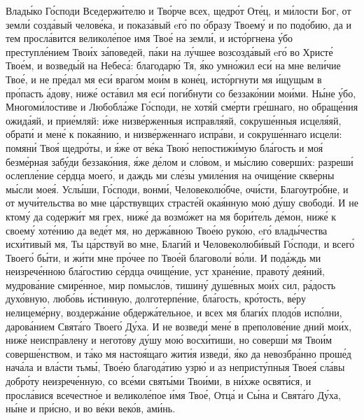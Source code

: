 \begin{mymulticols}
Влад\'{ы}ко Г\'{о}споди Вседерж\'{и}телю и Тв\'{о}рче всех, щедр\'{о}т От\'{е}ц, и м\'{и}лости Бог, от земл\'{и} созд\'{а}вый челов\'{е}ка, и показ\'{а}вый eг\'{о} по \'{о}бразу Твоем\'{у} и по под\'{о}бию, да и тем просл\'{а}вится великол\'{е}пое имя Тво\'{е} на земл\'{и}, и ист\'{о}ргнена \'{у}бо преступл\'{е}нием Тво\'{и}х з\'{а}поведей, п\'{а}ки на л\'{у}чшее возсозд\'{а}вый eг\'{о} во Христ\'{е} Тво\'{е}м, и возвед\'{ы}й на Небес\'{а}: благодар\'{ю} Тя, \'{я}ко умн\'{о}жил ес\'{и} на мне вел\'{и}чие Тво\'{е}, и не пр\'{е}дал мя ес\'{и} враг\'{о}м мо\'{и}м в кон\'{е}ц, ист\'{о}ргнути мя \'{и}щущым в пр\'{о}пасть \'{а}дову, ниж\'{е} ост\'{а}вил мя ес\'{и} пог\'{и}бнути со беззак\'{о}нии мо\'{и}ми. Н\'{ы}не \'{у}бо, Многом\'{и}лостиве и Любобл\'{а}же Г\'{о}споди, не хот\'{я}й см\'{е}рти гр\'{е}шнаго, но обращ\'{е}ния ожид\'{а}яй, и при\'{е}мляй: \'{и}же низв\'{е}рженныя исправл\'{я}яй, сокруш\'{е}нныя исцел\'{я}яй, обрат\'{и} и мен\'{е} к пока\'{я}нию, и низв\'{е}рженнаго испр\'{а}ви, и сокруш\'{е}ннаго исцел\'{и}: помян\'{и} Тво\'{я} щедр\'{о}ты, и \'{я}же от в\'{е}ка Тво\'{ю} непостиж\'{и}мую бл\'{а}гость и мо\'{я} безм\'{е}рная заб\'{у}ди беззак\'{о}ния, \'{я}же д\'{е}лом и сл\'{о}вом, и м\'{ы}слию соверш\'{и}х: разреш\'{и} ослепл\'{е}ние с\'{е}рдца моег\'{о}, и даждь ми сл\'{е}зы умил\'{е}ния на очищ\'{е}ние скв\'{е}рны м\'{ы}сли мое\'{я}. Усл\'{ы}ши, Г\'{о}споди, вонм\'{и}, Человекол\'{ю}бче, оч\'{и}сти, Благоутр\'{о}бне, и от муч\'{и}тельства во мне ц\'{а}рствувщих страст\'{е}й ока\'{я}нную мо\'{ю} д\'{у}шу свобод\'{и}. И не ктом\'{у} да содерж\'{и}т мя грех, ниж\'{е} да возм\'{о}жет на мя бор\'{и}тель д\'{е}мон, ниж\'{е} к своем\'{у} хот\'{е}нию да вед\'{е}т мя, но держ\'{а}вною Тво\'{е}ю рук\'{о}ю, eг\'{о} влад\'{ы}чества исх\'{и}тивый мя, Ты ц\'{а}рствуй во мне, Благ\'{и}й и Человеколюб\'{и}вый Г\'{о}споди, и всег\'{о} Твоег\'{о} б\'{ы}ти, и ж\'{и}ти мне пр\'{о}чее по Тво\'{е}й благовол\'{и} в\'{о}ли. И под\'{а}ждь ми неизреч\'{е}нною бл\'{а}гостию с\'{е}рдца очищ\'{е}ние, уст хран\'{е}ние, правот\'{у} де\'{я}ний, мудров\'{а}ние смир\'{е}нное, мир помысл\'{о}в, тишин\'{у} душ\'{е}вных мо\'{и}х сил, р\'{а}дость дух\'{о}вную, люб\'{о}вь \'{и}стинную, долготерп\'{е}ние, бл\'{а}гость, кр\'{о}тость, в\'{е}ру нелицем\'{е}рну, воздерж\'{а}ние обдерж\'{а}тельное, и всех мя благ\'{и}х плод\'{о}в исп\'{о}лни, даров\'{а}нием Свят\'{а}го Твоег\'{о} Д\'{у}ха. И не возвед\'{и} мен\'{е} в преполов\'{е}ние дний мо\'{и}х, ниж\'{е} неиспр\'{а}влену и негот\'{о}ву д\'{у}шу мо\'{ю} восх\'{и}тиши, но соверш\'{и} мя Тво\'{и}м соверш\'{е}нством, и т\'{а}ко мя насто\'{я}щаго жит\'{и}я извед\'{и}, \'{я}ко да невозбр\'{а}нно прош\'{е}д нач\'{а}ла и вл\'{а}сти тьм\'{ы}, Тво\'{е}ю благод\'{а}тию узр\'{ю} и аз неприст\'{у}пныя Твое\'{я} сл\'{а}вы добр\'{о}ту неизреч\'{е}нную, со вс\'{е}ми свят\'{ы}ми Тво\'{и}ми, в н\'{и}хже освят\'{и}ся, и просл\'{а}вися всечестн\'{о}е и великол\'{е}пое \'{и}мя Тво\'{е}, Отц\'{а} и С\'{ы}на и Свят\'{а}го Д\'{у}ха, н\'{ы}не и пр\'{и}сно, и во в\'{е}ки век\'{о}в, ам\'{и}нь.


\end{mymulticols}
